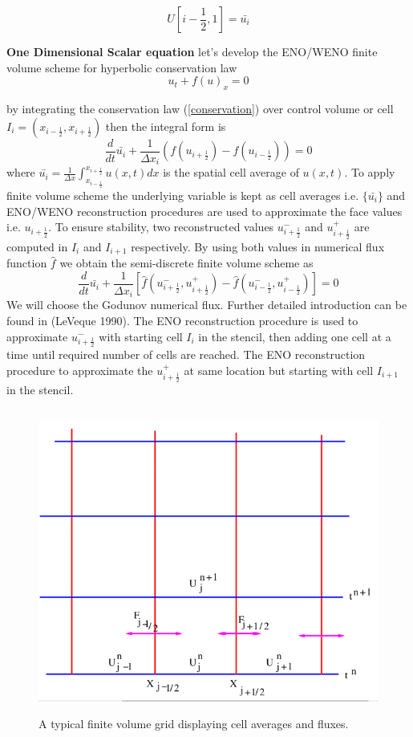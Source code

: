 \documentclass{article}
\begin{document}
\begin{equation}
    U[i-\frac{1}{2},1] = \bar{u_i}
\end{equation}

\noindent \textbf{One Dimensional Scalar equation} let's develop the ENO/WENO finite volume scheme for hyperbolic conservation law
\begin{equation}\label{conservation}
    u_t + f(u)_x = 0
\end{equation}

\noindent by integrating the conservation law (\ref{conservation}) over control volume or cell $I_i = (x_{i - \frac{1}{2}}, x_{i+ \frac{1}{2}} )$ then the integral form is
\begin{equation}
    \frac{d}{dt} \bar{u_i} + \frac{1}{\Delta x_i} \left(  f(u_{i+\frac{1}{2}}) -f(u_{i-\frac{1}{2}} ) \right)= 0
\end{equation}
\noindent where $\bar{u_i} = \frac{1}{\Delta x} \int_{x_{i - \frac{1}{2}}}^{x_{i + \frac{1}{2}}} u(x,t)dx $ is the spatial cell average of $u(x,t)$. To apply finite volume scheme the underlying variable is kept as cell averages i.e. $\{\bar{u_i} \}$ and ENO/WENO reconstruction procedures are used to approximate the face values i.e. $u_{i+\frac{1}{2}}$. To ensure stability, two reconstructed values $u^-_{i+\frac{1}{2}}$ and $u^+_{i + \frac{1}{2}}$ are computed in $I_i$ and $I_{i+1}$ respectively. By using both values in numerical flux function $\hat{f}$ we obtain the semi-discrete finite volume scheme as
\begin{equation}
    \frac{d}{dt} \bar{u_i} + \frac{1}{\Delta x_i} \left[ \hat{f}(u^{-}_{i+\frac{1}{2}},u^{+}_{{i+\frac{1}{2}}}) - \hat{f}(u^-_{i-\frac{1}{2}} , u^+_{i-\frac{1}{2}} ) \right] = 0
\end{equation}
\noindent We will choose the Godunov numerical flux. Further detailed introduction can be found in (LeVeque 1990). The ENO reconstruction procedure is used to approximate $u^-_{i+\frac{1}{2}}$ with starting cell $I_i$ in the stencil, then adding one cell at a time until required number of cells are reached. The ENO reconstruction procedure to approximate the $u^+_{i+\frac{1}{2}}$ at same location but starting with cell $I_{i+1}$ in the stencil.
\begin{figure}
    \centering
    \includegraphics[width=12cm,height=10cm]{Screenshot 2022-01-23 212157.png}
    \caption{A typical finite volume grid displaying cell averages and fluxes.}
    \label{fig:my_label}
\end{figure}


\printbibliography
\end{document}
